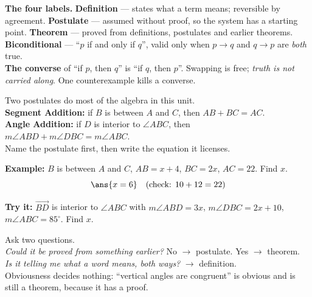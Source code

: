 \documentclass[12pt]{article}
\begin{document}

\begin{formulabox}
\textbf{The four labels.} \; \textbf{Definition} --- states what a term means;
reversible by agreement. \; \textbf{Postulate} --- assumed without proof, so the
system has a starting point. \; \textbf{Theorem} --- proved from definitions,
postulates and earlier theorems. \; \textbf{Biconditional} --- ``$p$ if and only
if $q$'', valid only when $p \rightarrow q$ and $q \rightarrow p$ are
\emph{both} true.\\[3pt]
\textbf{The converse} of ``if $p$, then $q$'' is ``if $q$, then $p$''. Swapping
is free; \emph{truth is not carried along}. One counterexample kills a converse.
\end{formulabox}


\begin{formulabox}
Two postulates do most of the algebra in this unit.\\[2pt]
\textbf{Segment Addition:} if $B$ is between $A$ and $C$, then $AB + BC = AC$.\\
\textbf{Angle Addition:} if $D$ is interior to $\angle ABC$, then
$m\angle ABD + m\angle DBC = m\angle ABC$.\\[2pt]
Name the postulate first, then write the equation it licenses.
\end{formulabox}

\begin{examplebox}
\textbf{Example:} $B$ is between $A$ and $C$, $AB = x+4$, $BC = 2x$, $AC = 22$.
Find $x$.
\[ \ans{x = 6} \quad\text{(check: } 10 + 12 = 22\text{)} \]
\end{examplebox}

\begin{tryitbox}
\textbf{Try it:} $\overrightarrow{BD}$ is interior to $\angle ABC$ with
$m\angle ABD = 3x$, $m\angle DBC = 2x+10$, $m\angle ABC = 85^\circ$. Find $x$.
\\[2pt]
\end{tryitbox}


\begin{formulabox}
Ask two questions.\\[2pt]
\emph{Could it be proved from something earlier?} No $\rightarrow$ postulate.
Yes $\rightarrow$ theorem.\\
\emph{Is it telling me what a word means, both ways?} $\rightarrow$ definition.
\\[2pt]
Obviousness decides nothing: ``vertical angles are congruent'' is obvious and is
still a theorem, because it has a proof.
\end{formulabox}
\end{document}
